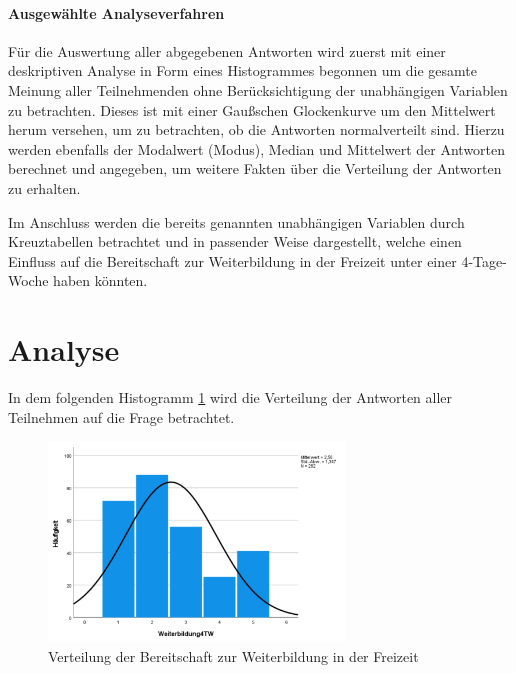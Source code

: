 \paragraph*{Ausgewählte Analyseverfahren}

Für die Auswertung aller abgegebenen Antworten wird zuerst mit einer deskriptiven Analyse in Form eines Histogrammes
begonnen um die gesamte Meinung aller Teilnehmenden ohne Berücksichtigung der unabhängigen Variablen zu betrachten. 
Dieses ist mit einer Gaußschen Glockenkurve um den Mittelwert herum versehen, um zu betrachten, ob die Antworten 
normalverteilt sind. %
Hierzu werden ebenfalls der Modalwert (Modus), Median und Mittelwert der Antworten berechnet und angegeben,
um weitere Fakten über die Verteilung der Antworten zu erhalten. %

Im Anschluss werden die bereits genannten unabhängigen Variablen durch Kreuztabellen betrachtet und
in passender Weise dargestellt, welche einen Einfluss auf die Bereitschaft zur Weiterbildung in der 
Freizeit unter einer 4-Tage-Woche haben könnten. 




\section{Analyse}

In dem folgenden Histogramm \ref{fig:bereitschaft_weiterbildung_verteilung} wird die Verteilung 
der Antworten aller Teilnehmen auf die Frage  betrachtet. 

\begin{figure}[h]
    \centering
    \includegraphics[width=0.7\textwidth]{04_Artefakte/01_Abbildungen/hypothese_9/histogramm_weiterbildung.png}
    \caption{Verteilung der Bereitschaft zur Weiterbildung in der Freizeit}
    \label{fig:bereitschaft_weiterbildung_verteilung}
\end{figure}

